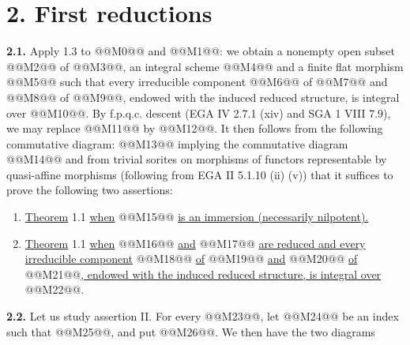 \section*{2. First reductions}

\textbf{2.1.} Apply 1.3 to @@M0@@ and @@M1@@: we obtain a nonempty open subset @@M2@@ of @@M3@@, an integral scheme @@M4@@ and a finite flat morphism @@M5@@ such that every irreducible component @@M6@@ of @@M7@@ and @@M8@@ of @@M9@@, endowed with the induced reduced structure, is integral over @@M10@@. By f.p.q.c. descent (EGA IV 2.7.1 (xiv) and SGA 1 VIII 7.9), we may replace @@M11@@ by @@M12@@. It then follows from the following commutative diagram:
@@M13@@
implying the commutative diagram
@@M14@@
and from trivial sorites on morphisms of functors representable by quasi-affine morphisms (following from EGA II 5.1.10 (ii) (v)) that it suffices to prove the following two assertions:
\begin{enumerate}[label=\Roman*.]
\item \uline{Theorem} 1.1 \uline{when} @@M15@@ \uline{is an immersion (necessarily nilpotent).}
\item \uline{Theorem} 1.1 \uline{when} @@M16@@ \uline{and} @@M17@@ \uline{are reduced and every irreducible component} @@M18@@ \uline{of} @@M19@@ \uline{and} @@M20@@ \uline{of} @@M21@@\uline{, endowed with the induced reduced structure, is integral over} @@M22@@.
\end{enumerate}

\textbf{2.2.} Let us study assertion II. For every @@M23@@, let @@M24@@ be an index such that @@M25@@, and put @@M26@@. We then have the two diagrams

